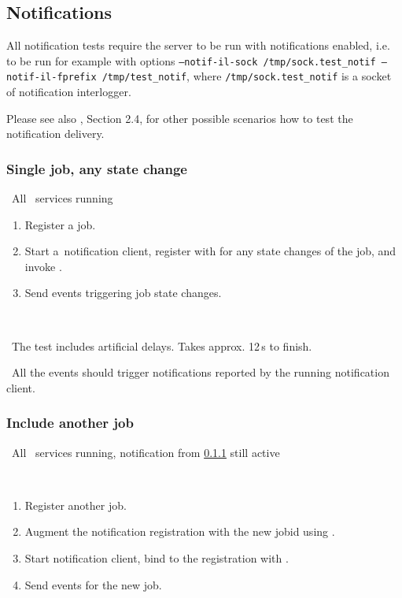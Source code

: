\subsection{Notifications}

All notification tests require the \LB server to be run with notifications enabled,
i.e. to be run for example with options 
\texttt{--notif-il-sock /tmp/sock.test\_notif --notif-il-fprefix /tmp/test\_notif}, 
where \texttt{/tmp/sock.test\_notif} is a socket of notification interlogger.

Please see also \cite{lbug}, Section 2.4, for other possible scenarios how to test the notification delivery.


\subsubsection{Single job, any state change}
\label{notif1}
\req\ All \LB\ services running

\what
\begin{enumerate}
\item Register a job.
\item Start a~notification client,
register with  for any state changes of the job,
and invoke .
\item Send events triggering job state changes.
\end{enumerate}

\how\ 

\note\ The test includes artificial delays. Takes approx. 12\,s to finish.

\result\ All the events should trigger notifications reported by the running
notification client.



\subsubsection{Include another job}
\label{notif2}
\req\ All \LB\ services running, notification from \ref{notif1} still active

\how\
\begin{enumerate}
\item Register another job.
\item Augment the notification registration with the new jobid using
\code{edg\_wll\_NotifChange}.
\item Start notification client, bind to the registration with
.
\item Send events for the new job.
\end{enumerate}

